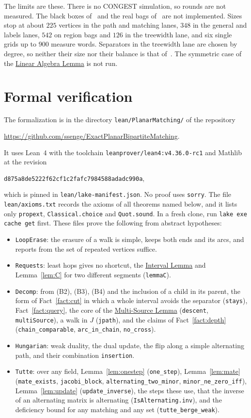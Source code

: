 \documentclass[11pt]{article}
\theoremstyle{definition}
\theoremstyle{remark}
\theoremstyle{plain}
\newcommand{\LemMS}{\hyperref[lem:ms]{Multi-Source Lemma}}
\newcommand{\LemLA}{\hyperref[lem:la]{Linear Algebra Lemma}}
\begin{document}
The limits are these. There is no CONGEST simulation, so rounds are not measured. The black boxes of~\cite{P20} and the real bags of~\cite{LP19} are not implemented. Sizes stop at about $225$ vertices in the path and matching lanes, $348$ in the general and labels lanes, $542$ on region bags and $126$ in the treewidth lane, and six single grids up to $900$ measure words. Separators in the treewidth lane are chosen by degree, so neither their size nor their
balance is that of~\cite{IKNS22}. The symmetric case of the \LemLA{} is not run.

\section{Formal verification}\label{sec:lean}

The formalization is in the directory \texttt{lean/PlanarMatching/} of the repository
\begin{center}
\url{https://github.com/ssenge/ExactPlanarBipartiteMatching}.
\end{center}
It uses Lean~4 with the toolchain \texttt{leanprover/lean4:v4.36.0-rc1} and Mathlib at the revision
\begin{center}
\texttt{d875a8de5222f62cf1c2fafc7984588adadc990a},
\end{center}
which is pinned in \texttt{lean/lake-manifest.json}. No proof uses \texttt{sorry}. The file \texttt{lean/axioms.txt} records the axioms of all theorems named below, and it lists only \texttt{propext}, \texttt{Classical.choice} and \texttt{Quot.sound}. In a fresh clone, run
\texttt{lake exe cache get} first. These files prove the following from abstract hypotheses:
\begin{itemize}
\item \texttt{LoopErase}: the erasure of a walk is simple, keeps both ends and its arcs, and reports from the set of repeated vertices suffice.
\item \texttt{Requests}: least hops gives no shortcut, the \hyperref[lem:A]{Interval Lemma} and Lemma~\ref{lem:C} for two different segments (\texttt{lemmaC}).
\item \texttt{Decomp}: from (B2), (B3), (B4) and the inclusion of a child in its parent, the form of Fact~\ref{fact:cut} in which a whole interval avoids the separator (\texttt{stays}), Fact~\ref{fact:query}, the core of the \LemMS{} (\texttt{descent}, \texttt{multiSource}), a walk in $J$ (\texttt{jpath}), and the claims of Fact~\ref{fact:depth} (\texttt{chain\_comparable}, \texttt{arc\_in\_chain}, \texttt{no\_cross}).
\item \texttt{Hungarian}: weak duality, the dual update, the flip along a simple alternating path, and their combination \texttt{insertion}.
\item \texttt{Tutte}: over any field, Lemma~\ref{lem:onestep} (\texttt{one\_step}), Lemma~\ref{lem:mate} (\texttt{mate\_exists}, \texttt{jacobi\_block}, \texttt{alternating\_two\_minor}, \texttt{minor\_ne\_zero\_iff}), Lemma~\ref{lem:update} (\texttt{update\_inverse}), the steps these use, that the inverse of an alternating matrix is alternating (\texttt{IsAlternating.inv}), and the deficiency bound for any matching and any set (\texttt{tutte\_berge\_weak}).
\end{itemize}
\end{document}
